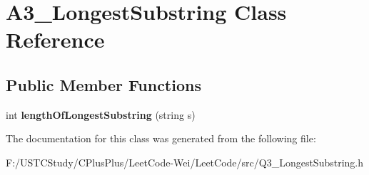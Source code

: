 \hypertarget{class_a3___longest_substring}{}\section{A3\+\_\+\+Longest\+Substring Class Reference}
\label{class_a3___longest_substring}
\subsection*{Public Member Functions}
\begin{DoxyCompactItemize}
\item 
\hypertarget{class_a3___longest_substring_afbd5622e1e0e1b75d9dddd93c7804930}{}\label{class_a3___longest_substring_afbd5622e1e0e1b75d9dddd93c7804930} 
int {\bfseries length\+Of\+Longest\+Substring} (string s)
\end{DoxyCompactItemize}


The documentation for this class was generated from the following file\+:\begin{DoxyCompactItemize}
\item 
F\+:/\+U\+S\+T\+C\+Study/\+C\+Plus\+Plus/\+Leet\+Code-\/\+Wei/\+Leet\+Code/src/Q3\+\_\+\+Longest\+Substring.\+h\end{DoxyCompactItemize}
